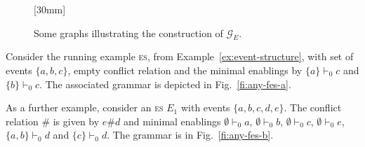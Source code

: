 \documentclass[conference]{IEEEtran}
\newcommand{\pgfBox}{
  \begin{pgfonlayer}{background} 
    \fill[blue!2,thick,draw=black!50,rounded corners,inner sep=3mm] ([xshift=-1.5pt]current bounding box.south west) rectangle ([xshift=1.5pt]current bounding box.north east);
  \end{pgfonlayer}
}
\newcommand{\esabbr}{\textsc{es}}
\begin{document}
\begin{figure}
{
  }
  \hfill
  [30mm]
  {
  }
  \hfill
  \mbox{}
  \caption{Some graphs illustrating the construction of $\mathcal{G}_E$.}
  \label{fi:any-fes}
\end{figure}


\begin{example}
  \label{ex:final}
  Consider the running example {\esabbr}, from
  Example~\ref{ex:event-structure}, with set of events
  $\{ a, b, c \}$, empty conflict relation and the minimal enablings by
  $\{a\} \vdash_0 c$ and $\{b\} \vdash_0 c$. The associated grammar is
  depicted in Fig.~\ref{fi:any-fes-a}.
  
  As a further example, consider an {\esabbr} $E_1$ with events
  $\{ a, b, c, d, e \}$. The conflict relation $\#$ is given by
  $e \# d$ and minimal enablings $\emptyset \vdash_0 a$,
  $\emptyset \vdash_0 b$, $\emptyset \vdash_0 c$, $\emptyset \vdash_0 e$,
  $\{a, b\} \vdash_0 d$ and $\{c\} \vdash_0 d$. The grammar is in
  Fig.~\ref{fi:any-fes-b}.
\end{example}
\end{document}
